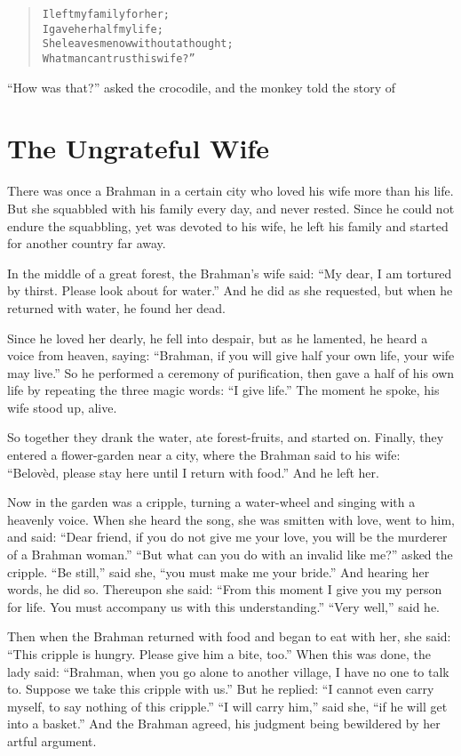 \documentclass[article, twoside, 14pt]{memoir}
\renewenvironment{verbatim}{%
\begin{quote}%
\vskip -10pt%
\begin{alltt}\normalfont\large}{\end{alltt}%
\end{quote}%
\vskip -10pt
} %
\begin{document}
\begin{verbatim}
I left my family for her;
    I gave her half my life;
She leaves me now without a thought;
    What man can trust his wife?”
\end{verbatim}
``How was that?'' asked the crocodile, and the monkey told the
story of

\chapter{The Ungrateful Wife}

\label{s71}

There was once a Brahman in a certain city who loved his wife
more than his life. But she squabbled with his family every day,
and never rested. Since he could not endure the squabbling, yet was
devoted to his wife, he left his family and started for another
country far away.

In the middle of a great forest, the Brahman's wife said:
``My dear, I am tortured by thirst. Please look about for water.''
And he did as she requested, but when he returned with water, he
found her dead.

Since he loved her dearly, he fell into despair, but as he
lamented, he heard a voice from heaven, saying:
``Brahman, if you will give half your own life, your wife may live.''
So he performed a ceremony of purification, then gave a half of his
own life by repeating the three magic words: ``I give life.'' The
moment he spoke, his wife stood up, alive.

So together they drank the water, ate forest-fruits, and started
on. Finally, they entered a flower-garden near a city, where the
Brahman said to his wife:
``Belovèd, please stay here until I return with food.'' And he left
her.

Now in the garden was a cripple, turning a water-wheel and singing
with a heavenly voice. When she heard the song, she was smitten
with love, went to him, and said:
``Dear friend, if you do not give me your love, you will be the murderer of a Brahman woman.''
``But what can you do with an invalid like me?'' asked the cripple.
``Be still,'' said she, ``you must make me your bride.'' And
hearing her words, he did so. Thereupon she said:
``From this moment I give you my person for life. You must accompany us with this understanding.''
``Very well,'' said he.

Then when the Brahman returned with food and began to eat with her,
she said: ``This cripple is hungry. Please give him a bite, too.''
When this was done, the lady said:
``Brahman, when you go alone to another village, I have no one to talk to. Suppose we take this cripple with us.''
But he replied:
``I cannot even carry myself, to say nothing of this cripple.''
``I will carry him,'' said she, ``if he will get into a basket.''
And the Brahman agreed, his judgment being bewildered by her artful
argument.
\end{document}
